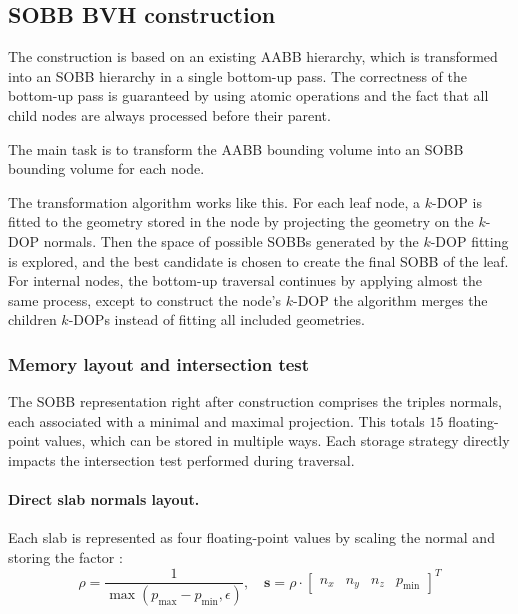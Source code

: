 \subsection{SOBB BVH construction}

The construction is based on an existing AABB hierarchy, which is transformed into an SOBB hierarchy in a single bottom-up pass. The correctness of the bottom-up pass is guaranteed by using atomic operations and the fact that all child nodes are always processed before their parent. \cite{KB25}

The main task is to transform the AABB bounding volume into an SOBB bounding volume for each node. 

The transformation algorithm works like this. For each leaf node, a $k$-DOP is fitted to the geometry stored in the node by projecting the geometry on the $k$-DOP normals. Then the space of possible SOBBs generated by the $k$-DOP fitting is explored, and the best candidate is chosen to create the final SOBB of the leaf. For internal nodes, the bottom-up traversal continues by applying almost the same process, except to construct the node's $k$-DOP the algorithm merges the children $k$-DOPs instead of fitting all included geometries. \cite{KB25}

\subsubsection{Memory layout and intersection test}

The SOBB representation right after construction comprises the triples normals, each associated with a minimal and maximal projection. This totals $15$ floating-point values, which can be stored in multiple ways. Each storage strategy directly impacts the intersection test performed during traversal. \cite{KB25}

\paragraph{Direct slab normals layout.} Each slab is represented as four floating-point values by scaling the normal and storing the factor \cite{KB25}:
\begin{equation}
    \rho = \frac{1}{\max(p_{\max} - p_{\min}, \epsilon)}, \quad
    \mathbf{s} = \rho \cdot \begin{bmatrix} n_x & n_y & n_z & p_{\min} \end{bmatrix}^{T}
    \label{eq:sobb-direct-slab-layout}
\end{equation}

